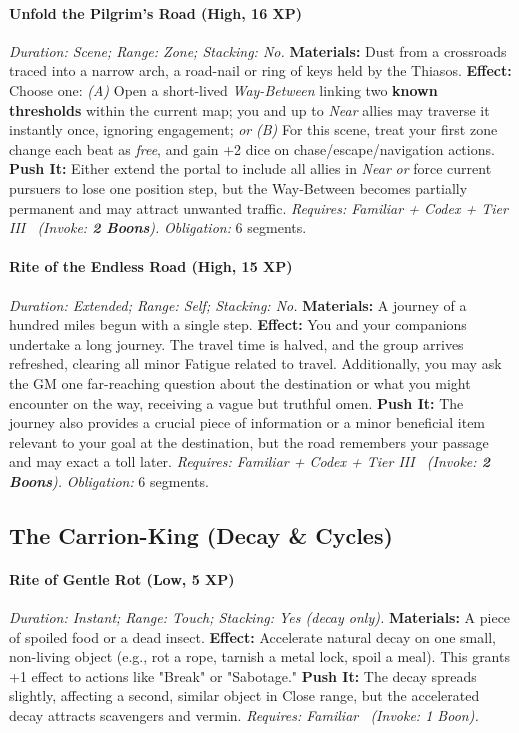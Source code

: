 \documentclass[12pt,twoside]{book}
\begin{document}
\paragraph{Unfold the Pilgrim's Road (High, 16 XP)} \emph{Duration: Scene; Range: Zone; Stacking: No.}
\textbf{Materials:} Dust from a crossroads traced into a narrow arch, a road-nail or ring of keys held by the Thiasos.
\textbf{Effect:} Choose one:
\emph{(A)} Open a short-lived \emph{Way-Between} linking two \textbf{known thresholds} within the current map; you and up to \emph{Near} allies may traverse it instantly once, ignoring engagement; \emph{or}
\emph{(B)} For this scene, treat your first zone change each beat as \emph{free}, and gain +2 dice on chase/escape/navigation actions.
\textbf{Push It:} Either extend the portal to include all allies in \emph{Near} \emph{or} force current pursuers to lose one position step, but the Way-Between becomes partially permanent and may attract unwanted traffic.
\emph{Requires: Familiar + Codex + Tier III \ (\textit{Invoke:} \textbf{2 Boons}).}
\emph{Obligation:} 6 segments.

\paragraph{Rite of the Endless Road (High, 15 XP)} \emph{Duration: Extended; Range: Self; Stacking: No.}
\textbf{Materials:} A journey of a hundred miles begun with a single step.
\textbf{Effect:} You and your companions undertake a long journey. The travel time is halved, and the group arrives refreshed, clearing all minor Fatigue related to travel. Additionally, you may ask the GM one far-reaching question about the destination or what you might encounter on the way, receiving a vague but truthful omen.
\textbf{Push It:} The journey also provides a crucial piece of information or a minor beneficial item relevant to your goal at the destination, but the road remembers your passage and may exact a toll later.
\emph{Requires: Familiar + Codex + Tier III \ (\textit{Invoke:} \textbf{2 Boons}).}
\emph{Obligation:} 6 segments.

\subsection{The Carrion-King (Decay \& Cycles)}
\paragraph{Rite of Gentle Rot (Low, 5 XP)} \emph{Duration: Instant; Range: Touch; Stacking: Yes (decay only).}
\textbf{Materials:} A piece of spoiled food or a dead insect.
\textbf{Effect:} Accelerate natural decay on one small, non-living object (e.g., rot a rope, tarnish a metal lock, spoil a meal). This grants +1 effect to actions like "Break" or "Sabotage."
\textbf{Push It:} The decay spreads slightly, affecting a second, similar object in Close range, but the accelerated decay attracts scavengers and vermin.
\emph{Requires: Familiar \ (\textit{Invoke:} 1 Boon).}
\end{document}
